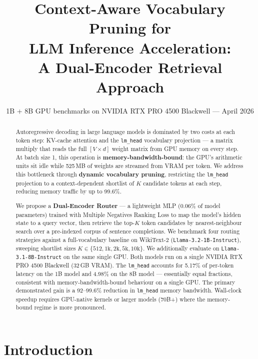 \documentclass[twocolumn,10pt]{article}
\title{%
  \vspace{-4mm}%
  \LARGE\bfseries
  Context-Aware Vocabulary Pruning for\\[2pt]
  LLM Inference Acceleration:\\[2pt]
  A Dual-Encoder Retrieval Approach%
  \vspace{-2mm}
}
\author{%
  \normalsize
  1B + 8B GPU benchmarks on NVIDIA RTX PRO 4500 Blackwell --- April 2026%
}
\date{}
\newcommand{\code}[1]{\texttt{#1}}
\begin{document}

\maketitle
\thispagestyle{empty}

\begin{abstract}
Autoregressive decoding in large language models is dominated by two costs at
each token step: KV-cache attention and the \code{lm\_head} vocabulary
projection --- a matrix multiply that reads the full $[V \times d]$ weight
matrix from GPU memory on every step. At batch size 1, this operation is
\textbf{memory-bandwidth-bound}: the GPU's arithmetic units sit idle while
525\,MB of weights are streamed from VRAM per token. We address this
bottleneck through \textbf{dynamic vocabulary pruning}, restricting the
\code{lm\_head} projection to a context-dependent shortlist of $K$ candidate
tokens at each step, reducing memory traffic by up to 99.6\%.

We propose a \textbf{Dual-Encoder Router} --- a lightweight MLP (0.06\% of
model parameters) trained with Multiple Negatives Ranking Loss to map the
model's hidden state to a query vector, then retrieve the top-$K$ token
candidates by nearest-neighbour search over a pre-indexed corpus of sentence
completions. We benchmark four routing strategies against a full-vocabulary
baseline on WikiText-2 (\code{Llama-3.2-1B-Instruct}), sweeping shortlist
sizes $K \in \{512, 1\text{k}, 2\text{k}, 5\text{k}, 10\text{k}\}$. We
additionally evaluate on \code{Llama-3.1-8B-Instruct} on the same single GPU.
Both models run on a single NVIDIA RTX PRO 4500 Blackwell (32\,GB VRAM). The
\code{lm\_head} accounts for 5.17\% of per-token latency on the 1B model and
4.98\% on the 8B model --- essentially equal fractions, consistent with
memory-bandwidth-bound behaviour on a single GPU. The primary demonstrated
gain is a 92--99.6\% reduction in \code{lm\_head} memory bandwidth.
Wall-clock speedup requires GPU-native kernels or larger models (70B+) where
the memory-bound regime is more pronounced.
\end{abstract}

\section{Introduction}
\end{document}
